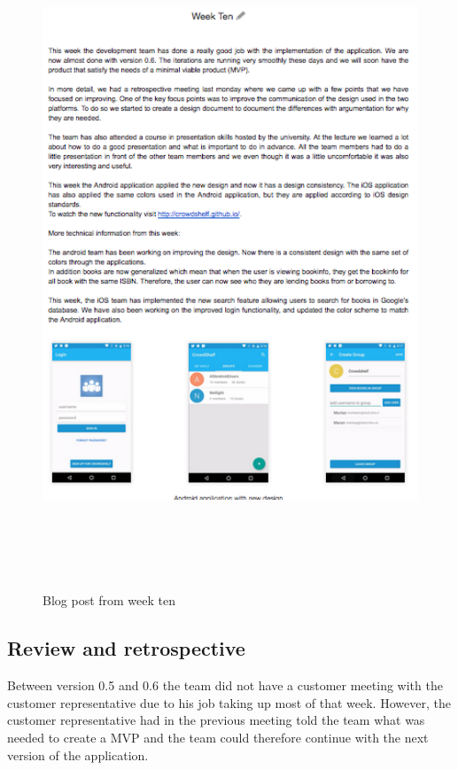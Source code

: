 \begin{figure}
\centering
\includegraphics[height=20cm]{figs/v05/weekTen.png}
\caption{Blog post from week ten}
\label{fig:week-ten}
\end{figure}



\subsection{Review and retrospective}
Between version 0.5 and 0.6 the team did not have a customer meeting with the customer representative due to his job taking up most of that week. However, the customer representative had in the previous meeting told the team what was needed to create a \gls{MVP} and the team could therefore continue with the next version of the application.

